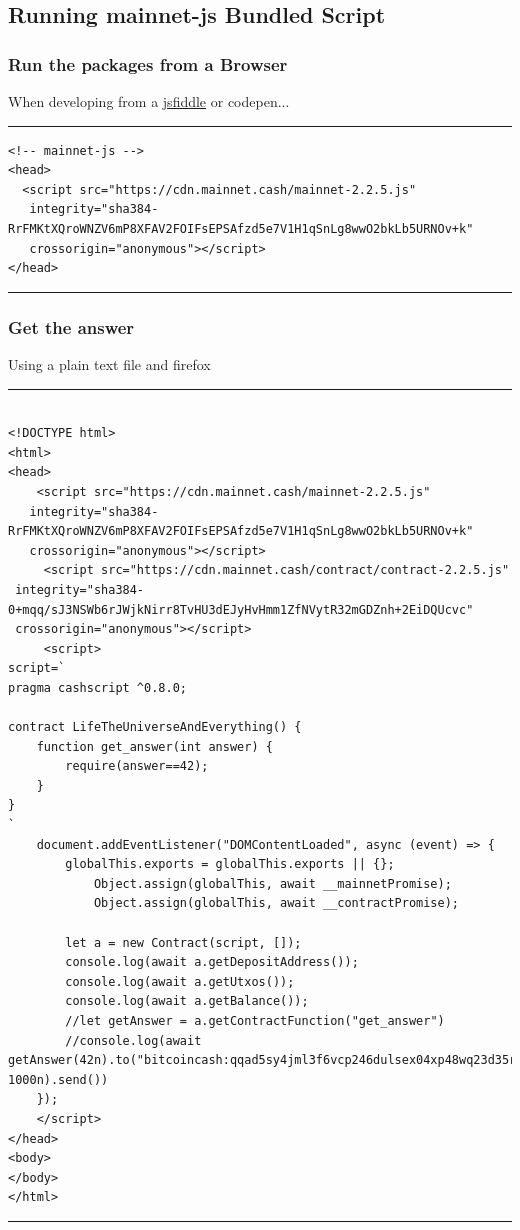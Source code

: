 \documentclass{beamer}
\begin{document}
\subsection[Javascript]{Running mainnet-js Bundled Script}

\begin{frame}[fragile]
    \frametitle{Run the packages from a Browser}
    When developing from a \href{https://jsfiddle.net/bdqujn25/}{jsfiddle} or codepen...

    
    \rule{\textwidth}{0.4pt}
    \tiny
    \begin{verbatim}
<!-- mainnet-js -->
<head>
  <script src="https://cdn.mainnet.cash/mainnet-2.2.5.js"
   integrity="sha384-RrFMKtXQroWNZV6mP8XFAV2FOIFsEPSAfzd5e7V1H1qSnLg8wwO2bkLb5URNOv+k"
   crossorigin="anonymous"></script>
</head>
    \end{verbatim}
\rule{\textwidth}{0.4pt}
\end{frame}


\begin{frame}[fragile]
    \frametitle{Get the answer}
    Using a plain text file and firefox
    \rule{\textwidth}{0.4pt}
    {\fontsize{3pt}{3.6pt}\selectfont
    \begin{verbatim}
      
<!DOCTYPE html>
<html>
<head>
    <script src="https://cdn.mainnet.cash/mainnet-2.2.5.js"
   integrity="sha384-RrFMKtXQroWNZV6mP8XFAV2FOIFsEPSAfzd5e7V1H1qSnLg8wwO2bkLb5URNOv+k"
   crossorigin="anonymous"></script>
     <script src="https://cdn.mainnet.cash/contract/contract-2.2.5.js"
 integrity="sha384-0+mqq/sJ3NSWb6rJWjkNirr8TvHU3dEJyHvHmm1ZfNVytR32mGDZnh+2EiDQUcvc"
 crossorigin="anonymous"></script>
     <script>
script=`
pragma cashscript ^0.8.0;

contract LifeTheUniverseAndEverything() {
    function get_answer(int answer) {
        require(answer==42);
    }
}
`
    document.addEventListener("DOMContentLoaded", async (event) => {
        globalThis.exports = globalThis.exports || {};
            Object.assign(globalThis, await __mainnetPromise);
            Object.assign(globalThis, await __contractPromise);

        let a = new Contract(script, []);
        console.log(await a.getDepositAddress());
        console.log(await a.getUtxos());
        console.log(await a.getBalance());
        //let getAnswer = a.getContractFunction("get_answer")
        //console.log(await getAnswer(42n).to("bitcoincash:qqad5sy4jml3f6vcp246dulsex04xp48wq23d35rqe", 1000n).send())
    });
    </script>     
</head>
<body>
</body>
</html>
    \end{verbatim}
    }
\rule{\textwidth}{0.4pt}
\end{frame}
\end{document}
